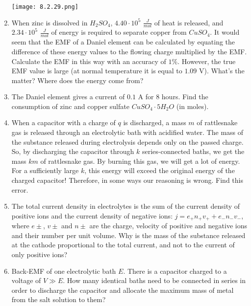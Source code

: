\documentclass{article}
\begin{document}
\begin{enumerate}[label=8.2.\arabic*]
\begin{center}
    \texttt{[image: 8.2.29.png]}
\end{center}

\item When zinc is dissolved in $H_2 SO_4$, $4.40 \cdot 10^5$ $\frac{J}{mol}$ of heat is released, and $2.34 \cdot 10^5$ $\frac{J}{mol}$ of energy is required to separate copper from $Cu SO_4$. It would seem that the EMF of a Daniel element can be calculated by equating the difference of these energy values to the flowing charge multiplied by the EMF. Calculate the EMF in this way with an accuracy of $1 \%$. However, the true EMF value is large (at normal temperature it is equal to $1.09$ V). What's the matter? Where does the energy come from?

\item The Daniel element gives a current of $0.1$ A for $8$ hours. Find the consumption of zinc and copper sulfate $CuSO_4 \cdot 5H_2O$ (in moles).

\item When a capacitor with a charge of $q$ is discharged, a mass $m$ of rattlesnake gas is released through an electrolytic bath with acidified water. The mass of the substance released during electrolysis depends only on the passed charge. So, by discharging the capacitor through $k$ series-connected baths, we get the mass $km$ of rattlesnake gas. By burning this gas, we will get a lot of energy. For a sufficiently large $k$, this energy will exceed the original energy of the charged capacitor! Therefore, in some ways our reasoning is wrong. Find this error.

\item The total current density in electrolytes is the sum of the current density of positive ions and the current density of negative ions: $j = e_+n_+v_+ + e_- n_- v_-$, where $e \pm$, $v \pm$ and $n \pm$ are the charge, velocity of positive and negative ions and their number per unit volume. Why is the mass of the substance released at the cathode proportional to the total current, and not to the current of only positive ions?

\item Back-EMF of one electrolytic bath $E$. There is a capacitor charged to a voltage of $V \gg E$. How many identical baths need to be connected in series in order to discharge the capacitor and allocate the maximum mass of metal from the salt solution to them?



\end{enumerate}
\end{document}
